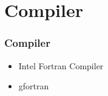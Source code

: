 \section{Compiler}
\begin{frame}
    \frametitle{Compiler}
    \begin{itemize}
        \item Intel Fortran Compiler
        \item gfortran
    \end{itemize}
\end{frame}
